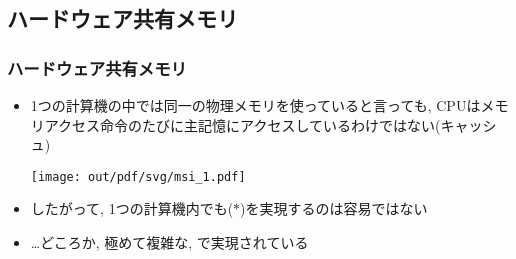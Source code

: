 \documentclass[12pt,dvipdfmx]{beamer}
\begin{document}
\subsection{ハードウェア共有メモリ}

\begin{frame}
  \frametitle{ハードウェア共有メモリ}
  \begin{itemize}
  \item 1つの計算機の中では同一の物理メモリを使っていると言っても,
    CPUはメモリアクセス命令のたびに主記憶にアクセスしているわけではない(キャッシュ)

    \begin{center}
      \texttt{[image: out/pdf/svg/msi\_1.pdf]}
    \end{center}
    
  \item したがって, 1つの計算機内でも($\ast$)を実現するのは容易ではない
  \item \ldots どころか, 極めて複雑な, 
    で実現されている
  \end{itemize}
\end{frame}


\newcommand{\Mbox}{{\textcolor{green}{\rule{3mm}{4mm}}}}
\newcommand{\Shbox}{{\textcolor{yellow}{\rule{3mm}{2.5mm}}}}
\newcommand{\Ibox}{{\textcolor{red}{\rule{3mm}{1mm}}}}
\end{document}
